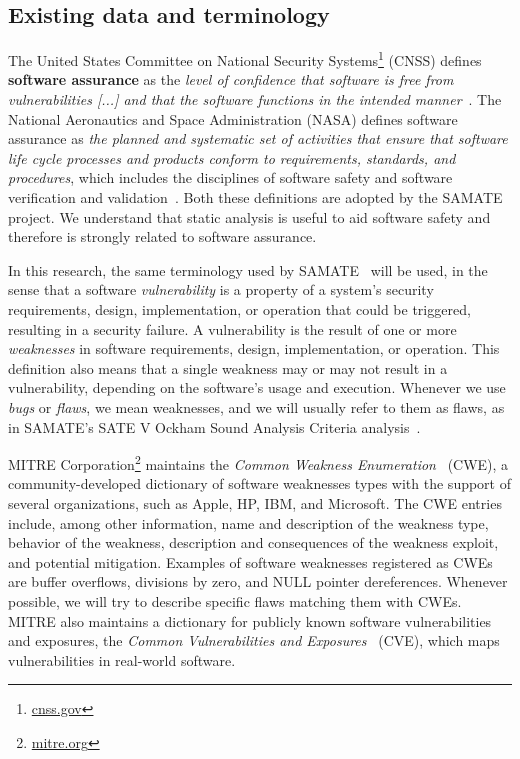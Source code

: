 \subsection{Existing data and terminology}
\label{sub:terminology}

The United States Committee on National Security
Systems\footnote{\url{cnss.gov}} (CNSS) defines \textbf{software assurance} as
the \textit{level of confidence that software is free from vulnerabilities [...]
and that the software functions in the intended
manner}~\citep{instruction20034009}. The National Aeronautics and Space
Administration (NASA) defines software assurance as \textit{the planned and
systematic set of activities that ensure that software life cycle processes and
products conform to requirements, standards, and procedures}, which includes
the disciplines of software safety and software verification and
validation~\citep{nasastd8739}. Both these definitions are adopted by the SAMATE
project. We understand that static analysis is useful to aid software safety
and therefore is strongly related to software assurance.

In this research, the same terminology used by
SAMATE~\citep{black_counting_2011} will be used, in the sense that a software
\textit{vulnerability} is a property of a system's security requirements,
design, implementation, or operation that could be triggered, resulting in a
security failure. A vulnerability is the result of one or more
\textit{weaknesses} in software requirements, design, implementation, or
operation. This definition also means that a single weakness may or may not result in a
vulnerability, depending on the software's usage and execution. Whenever we use
\textit{bugs} or \textit{flaws}, we mean weaknesses, and we will usually refer
to them as flaws, as in SAMATE's SATE V Ockham Sound Analysis Criteria
analysis~\citep{black_sate_2016}.

MITRE Corporation\footnote{\url{mitre.org}} maintains the \textit{Common Weakness
Enumeration}~\citep{cwe_page} (CWE), a community-developed dictionary of
software weaknesses types with the support of several organizations, such as Apple,
HP, IBM, and Microsoft. The CWE entries include, among other information, name
and description of the weakness type, behavior of the weakness, description and
consequences of the weakness exploit, and potential mitigation. Examples of
software weaknesses registered as CWEs are buffer overflows, divisions by zero,
and NULL pointer dereferences. Whenever possible, we will try to describe
specific flaws matching them with CWEs. MITRE also maintains a dictionary for
publicly known software vulnerabilities and exposures, the \textit{Common
Vulnerabilities and Exposures}~\citep{cve_page} (CVE), which maps vulnerabilities
in real-world software.

